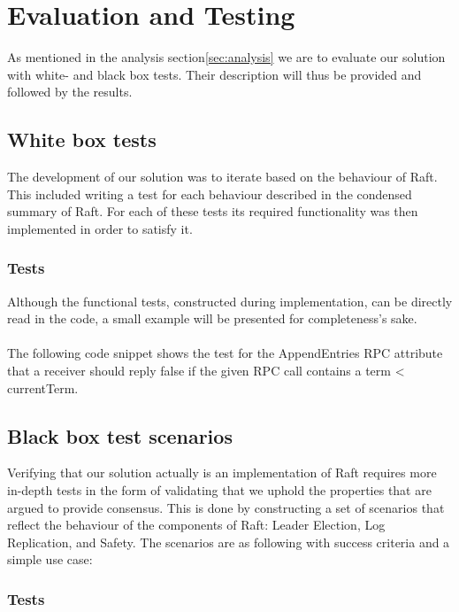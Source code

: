 \section{Evaluation and Testing} %
\label{sec:evaluation_and_testing}
As mentioned in the analysis section\ref{sec:analysis} we are to evaluate our solution with white- and black box tests. Their description will thus be provided and followed by the results.

\subsection{White box tests}
The development of our solution was to iterate based on the behaviour of Raft. This included writing a test for each behaviour described in the condensed summary of Raft\cite{Raft}. For each of these tests its required functionality was then implemented in order to satisfy it.


\subsubsection{Tests}
Although the functional tests, constructed during implementation, can be directly read in the code, a small example will be presented for completeness's sake.\\ \\
The following code snippet shows the test for the AppendEntries RPC attribute that a receiver should reply false if the given RPC call contains a term < currentTerm.


\subsection{Black box test scenarios}
Verifying that our solution actually is an implementation of Raft requires more in-depth tests in the form of validating that we uphold the properties that are argued to provide consensus. This is done by constructing a set of scenarios that reflect the behaviour of the components of Raft: Leader Election, Log Replication, and Safety. The scenarios are as following with success criteria and a simple use case:

\subsubsection{Tests}
\label{subsub:evaluation_test_tests}

